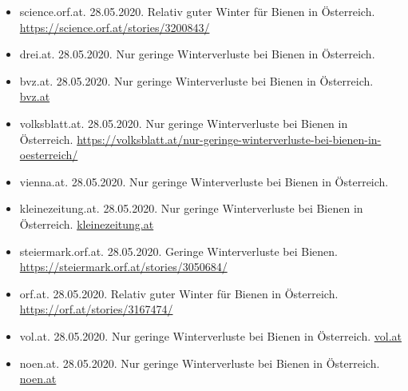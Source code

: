 \begin{itemize}
    \item
    science.orf.at. 28.05.2020. Relativ guter Winter für Bienen in Österreich. \url{https://science.orf.at/stories/3200843/}
    
    \item
    drei.at. 28.05.2020. Nur geringe Winterverluste bei Bienen in Österreich.  
    
    \item
    bvz.at. 28.05.2020. Nur geringe Winterverluste bei Bienen in Österreich. \href{https://www.bvz.at/in-ausland/uni-graz-erforschte-nur-geringe-winterverluste-bei-bienen-in-oesterreich-oesterreich-agrar-tierkrankheiten-zoologie-oesterreich-207676823}{bvz.at}
    
    \item
    volksblatt.at. 28.05.2020. Nur geringe Winterverluste bei Bienen in Österreich. \url{https://volksblatt.at/nur-geringe-winterverluste-bei-bienen-in-oesterreich/}
    
    \item
    vienna.at. 28.05.2020. Nur geringe Winterverluste bei Bienen in Österreich. 
    
    \item
    kleinezeitung.at. 28.05.2020. Nur geringe Winterverluste bei Bienen in Österreich. \href{https://www.kleinezeitung.at/international/tiere/5819585/Imker-zufrieden_Geringe-Winterverluste-bei-unseren-Bienen}{kleinezeitung.at}
    
    \item
    steiermark.orf.at. 28.05.2020. Geringe Winterverluste bei Bienen. \url{https://steiermark.orf.at/stories/3050684/ }
    
    \item
    orf.at. 28.05.2020. Relativ guter Winter für Bienen in Österreich. 
    \url{https://orf.at/stories/3167474/}
    
    \item
    vol.at. 28.05.2020. Nur geringe Winterverluste bei Bienen in Österreich. \href{https://www.vol.at/nur-geringe-winterverluste-bei-bienen-in-oesterreich/6630935#:~:text=Eine%20gute%20Nachricht%20von%20%C3%96sterreichs,Winter%202019%2F20%20nicht%20%C3%BCberlebt.}{vol.at}
    
    \item
    noen.at. 28.05.2020. Nur geringe Winterverluste bei Bienen in Österreich. \href{https://www.noen.at/in-ausland/uni-graz-erforschte-nur-geringe-winterverluste-bei-bienen-in-oesterreich-oesterreich-agrar-tierkrankheiten-zoologie-oesterreich-207676823}{noen.at}
    

\end{itemize}
